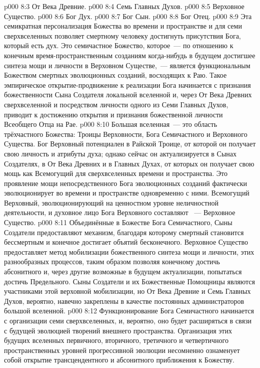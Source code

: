 \vs p000 8:3 От Века Древние.
\vs p000 8:4 Семь Главных Духов.
\vs p000 8:5 Верховное Существо.
\vs p000 8:6 Бог Дух.
\vs p000 8:7 Бог Сын.
\vs p000 8:8 Бог Отец.
\vs p000 8:9 \pc Эта семикратная персонализация Божества во времени и пространстве и для семи сверхвселенных позволяет смертному человеку достигнуть присутствия Бога, который есть дух. Это семичастное Божество, которое~--- по отношению к конечным время\hyp{}пространственным созданиям когда\hyp{}нибудь в будущем достигшее синтеза мощи и личности в Верховном Существе,~--- является функциональным Божеством смертных эволюционных созданий, восходящих к Раю. Такое эмпирическое открытие\hyp{}продвижение к реализации Бога начинается с признания божественности Сына Создателя локальной вселенной и, через От Века Древних сверхвселенной и посредством личности одного из Семи Главных Духов, приводит к достижению открытия и признания божественной личности Всеобщего Отца на Рае.
\vs p000 8:10 \pc Большая вселенная~--- это область трёхчастного Божества: Троицы Верховности, Бога Семичастного и Верховного Существа. Бог Верховный потенциален в Райской Троице, от которой он получает свою личность и атрибуты духа; однако сейчас он актуализируется в Сынах Создателях, в От Века Древних и в Главных Духах, от которых он получает свою мощь как Всемогущий для сверхвселенных времени и пространства. Это проявление мощи непосредственного Бога эволюционных созданий фактически эволюционирует во времени и пространстве одновременно с ними. Всемогущий Верховный, эволюционирующий на ценностном уровне неличностной деятельности, и духовное лицо Бога Верховного составляют ~--- Верховное Существо.
\vs p000 8:11 Объединённые в Божестве Бога Семичастного, Сыны Создатели предоставляют механизм, благодаря которому смертный становится бессмертным и конечное достигает объятий бесконечного. Верховное Существо предоставляет метод мобилизации божественного синтеза мощи и личности,  этих разнообразных процессов, таким образом позволяя конечному достичь абсонитного и, через другие возможные в будущем актуализации, попытаться достичь Предельного. Сыны Создатели и их Божественные Помощницы являются участниками этой верховной мобилизации, но От Века Древние и Семь Главных Духов, вероятно, навечно закреплены в качестве постоянных администраторов большой вселенной.
\vs p000 8:12 Функционирование Бога Семичастного начинается с организации семи сверхвселенных, и, вероятно, оно будет расширяться в связи с будущей эволюцией творений внешнего пространства. Организация этих будущих вселенных первичного, вторичного, третичного и четвертичного пространственных уровней прогрессивной эволюции несомненно ознаменует собой открытие трансцендентного и абсонитного приближения к Божеству.
